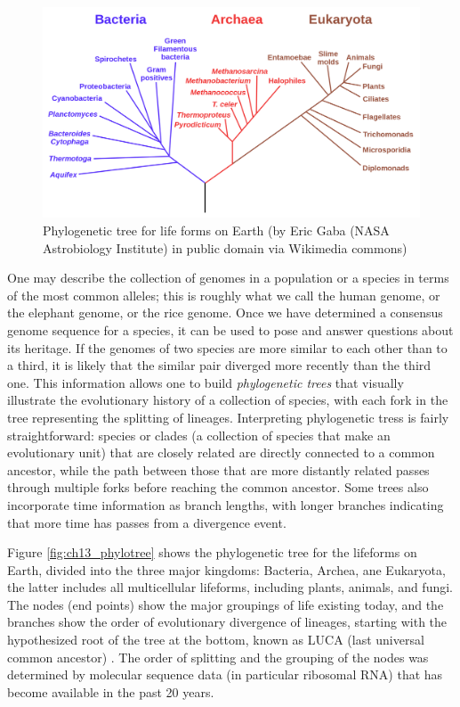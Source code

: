 \documentclass[
]{book}
\theoremstyle{definition}
\theoremstyle{definition}
\theoremstyle{definition}
\theoremstyle{remark}
\begin{document}
\begin{figure}
\centering
\includegraphics{ch13/Phylogenetic_tree.png}
\caption{Phylogenetic tree for life forms on Earth (by Eric Gaba (NASA Astrobiology Institute) in public domain via Wikimedia commons)}
\end{figure}

One may describe the collection of genomes in a population or a species in terms of the most common alleles; this is roughly what we call the human genome, or the elephant genome, or the rice genome. Once we have determined a consensus genome sequence for a species, it can be used to pose and answer questions about its heritage. If the genomes of two species are more similar to each other than to a third, it is likely that the similar pair diverged more recently than the third one. This information allows one to build \emph{phylogenetic trees} that visually illustrate the evolutionary history of a collection of species, with each fork in the tree representing the splitting of lineages. Interpreting phylogenetic tress is fairly straightforward: species or clades (a collection of species that make an evolutionary unit) that are closely related are directly connected to a common ancestor, while the path between those that are more distantly related passes through multiple forks before reaching the common ancestor. Some trees also incorporate time information as branch lengths, with longer branches indicating that more time has passes from a divergence event.

Figure \ref{fig:ch13_phylotree} shows the phylogenetic tree for the lifeforms on Earth, divided into the three major kingdoms: Bacteria, Archea, ane Eukaryota, the latter includes all multicellular lifeforms, including plants, animals, and fungi. The nodes (end points) show the major groupings of life existing today, and the branches show the order of evolutionary divergence of lineages, starting with the hypothesized root of the tree at the bottom, known as LUCA (last universal common ancestor) \citep{futuyma_evolution_2009}. The order of splitting and the grouping of the nodes was determined by molecular sequence data (in particular ribosomal RNA) that has become available in the past 20 years.
\end{document}
